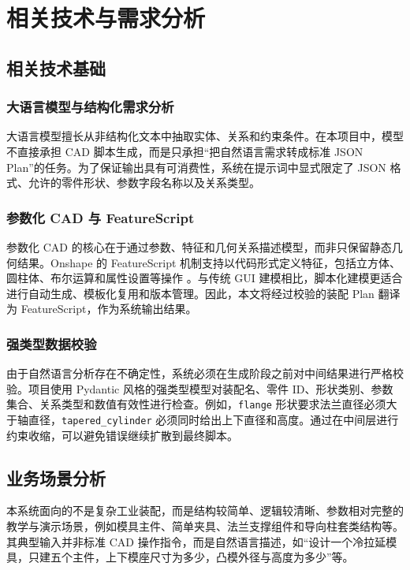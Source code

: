 \section{相关技术与需求分析}

\subsection{相关技术基础}

\subsubsection{大语言模型与结构化需求分析}

大语言模型擅长从非结构化文本中抽取实体、关系和约束条件。在本项目中，模型不直接承担 CAD 脚本生成，而是只承担“把自然语言需求转成标准 JSON Plan”的任务。为了保证输出具有可消费性，系统在提示词中显式限定了 JSON 格式、允许的零件形状、参数字段名称以及关系类型。

\subsubsection{参数化 CAD 与 FeatureScript}

参数化 CAD 的核心在于通过参数、特征和几何关系描述模型，而非只保留静态几何结果。Onshape 的 FeatureScript 机制支持以代码形式定义特征，包括立方体、圆柱体、布尔运算和属性设置等操作 \cite{onshape_fsdoc}。与传统 GUI 建模相比，脚本化建模更适合进行自动生成、模板化复用和版本管理。因此，本文将经过校验的装配 Plan 翻译为 FeatureScript，作为系统输出结果。

\subsubsection{强类型数据校验}

由于自然语言分析存在不确定性，系统必须在生成阶段之前对中间结果进行严格校验。项目使用 Pydantic 风格的强类型模型对装配名、零件 ID、形状类别、参数集合、关系类型和数值有效性进行检查。例如，\texttt{flange} 形状要求法兰直径必须大于轴直径，\texttt{tapered\_cylinder} 必须同时给出上下直径和高度。通过在中间层进行约束收缩，可以避免错误继续扩散到最终脚本。

\subsection{业务场景分析}

本系统面向的不是复杂工业装配，而是结构较简单、逻辑较清晰、参数相对完整的教学与演示场景，例如模具主件、简单夹具、法兰支撑组件和导向柱套类结构等。其典型输入并非标准 CAD 操作指令，而是自然语言描述，如“设计一个冷拉延模具，只建五个主件，上下模座尺寸为多少，凸模外径与高度为多少”等。

